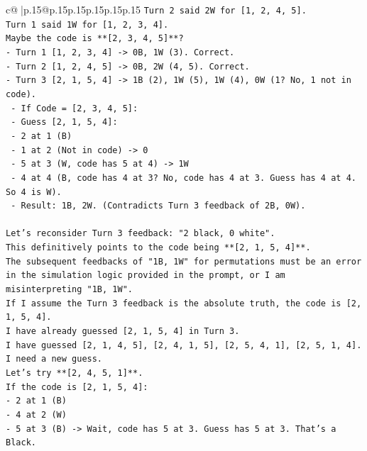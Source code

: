 \documentclass{article}
\begin{document}
{\begin{supertabular}{c@{$\;$}|p{.15\linewidth}@{}p{.15\linewidth}p{.15\linewidth}p{.15\linewidth}p{.15\linewidth}p{.15\linewidth}}
{{{\texttt{Turn 2 said 2W for {[}1, 2, 4, 5{]}.} \\
\texttt{Turn 1 said 1W for {[}1, 2, 3, 4{]}.} \\
\texttt{Maybe the code is **{[}2, 3, 4, 5{]}**?} \\
\texttt{{-} Turn 1 {[}1, 2, 3, 4{]} {-}> 0B, 1W (3). Correct.} \\
\texttt{{-} Turn 2 {[}1, 2, 4, 5{]} {-}> 0B, 2W (4, 5). Correct.} \\
\texttt{{-} Turn 3 {[}2, 1, 5, 4{]} {-}> 1B (2), 1W (5), 1W (4), 0W (1? No, 1 not in code).} \\
\texttt{  {-} If Code = {[}2, 3, 4, 5{]}:} \\
\texttt{  {-} Guess {[}2, 1, 5, 4{]}:} \\
\texttt{    {-} 2 at 1 (B)} \\
\texttt{    {-} 1 at 2 (Not in code) {-}> 0} \\
\texttt{    {-} 5 at 3 (W, code has 5 at 4) {-}> 1W} \\
\texttt{    {-} 4 at 4 (B, code has 4 at 3? No, code has 4 at 3. Guess has 4 at 4. So 4 is W).} \\
\texttt{    {-} Result: 1B, 2W. (Contradicts Turn 3 feedback of 2B, 0W).} \\
\\ 
\texttt{Let's reconsider Turn 3 feedback: "2 black, 0 white".} \\
\texttt{This definitively points to the code being **{[}2, 1, 5, 4{]}**.} \\
\texttt{The subsequent feedbacks of "1B, 1W" for permutations must be an error in the simulation logic provided in the prompt, or I am misinterpreting "1B, 1W".} \\
\texttt{If I assume the Turn 3 feedback is the absolute truth, the code is {[}2, 1, 5, 4{]}.} \\
\texttt{I have already guessed {[}2, 1, 5, 4{]} in Turn 3.} \\
\texttt{I have guessed {[}2, 1, 4, 5{]}, {[}2, 4, 1, 5{]}, {[}2, 5, 4, 1{]}, {[}2, 5, 1, 4{]}.} \\
\texttt{I need a new guess.} \\
\texttt{Let's try **{[}2, 4, 5, 1{]}**.} \\
\texttt{If the code is {[}2, 1, 5, 4{]}:} \\
\texttt{{-} 2 at 1 (B)} \\
\texttt{{-} 4 at 2 (W)} \\
\texttt{{-} 5 at 3 (B) {-}> Wait, code has 5 at 3. Guess has 5 at 3. That's a Black.} \\
}}}
\end{supertabular}}
\end{document}
